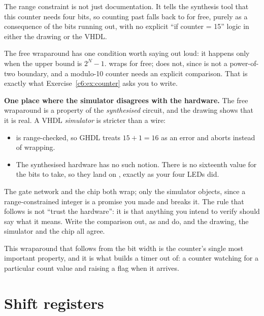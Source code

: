 The range constraint  is not just documentation. It tells the synthesis tool that this
counter needs four bits, so counting past  falls back to  for free, purely as a
consequence of the bits running out, with no explicit ``if counter = 15'' logic in either the
drawing or the VHDL.

The free wraparound has one condition worth saying out loud: it happens only when the upper bound is
$2^N - 1$.  wraps for free;  does not, since  is not a
power-of-two boundary, and a modulo-10 counter needs an explicit comparison. That is exactly what
Exercise~\ref{c6:ex:counter} asks you to write.

\begin{warning}
\textbf{One place where the simulator disagrees with the hardware.} The free wraparound is a
property of the \emph{synthesised} circuit, and the drawing shows that it is real. A VHDL
\emph{simulator} is stricter than a wire:
\begin{itemize}
  \item {} is range-checked, so GHDL treats $15 + 1 = 16$ as an error and
    aborts instead of wrapping.
  \item The synthesised hardware has no such notion. There is no sixteenth value for the bits to
    take, so they land on , exactly as your four LEDs did.
\end{itemize}
The gate network and the chip both wrap; only the simulator objects, since a range-constrained
integer is a promise you made and  breaks it. The rule that follows is not ``trust the
hardware'': it is that anything you intend to verify should say what it means. Write the comparison
out, as  and  do, and the drawing, the simulator and the chip all
agree.
\end{warning}

This wraparound that follows from the bit width is the counter's single most important property, and
it is what  builds a timer out of: a counter watching for a particular count value and
raising a flag when it arrives.

\section{Shift registers}
\label{c6:sec:shift}

